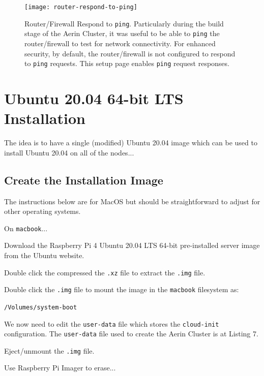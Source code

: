 \documentclass{report}
\begin{document}
\begin{figure}
	\centering	
	\texttt{[image: router-respond-to-ping]}
	\caption{Router/Firewall Respond to \texttt{ping}. Particularly during the build stage of the Aerin Cluster, it was useful to be able to \texttt{ping} the router/firewall to test for network connectivity. For enhanced security, by default, the router/firewall is not configured to respond to \texttt{ping} requests. This setup page enables \texttt{ping} request responses.}
\end{figure}


%
%
\clearpage\section{Ubuntu 20.04 64-bit LTS Installation}

The idea is to have a single (modified) Ubuntu 20.04 image which can be used to install Ubuntu 20.04 on all of the nodes...


%
%
\subsection{Create the Installation Image}

The instructions below are for MacOS but should be straightforward to adjust for other operating systems.

On \verb|macbook|...

Download the Raspberry Pi 4 Ubuntu 20.04 LTS 64-bit pre-installed server image from the Ubuntu website.

Double click the compressed the \verb|.xz| file to extract the \verb|.img| file. 

Double click the \verb|.img| file to mount the image in the \verb|macbook| filesystem as:

\verb|/Volumes/system-boot|

We now need to edit the \verb|user-data| file which stores the \verb|cloud-init| configuration. The \verb|user-data| file used to create the Aerin Cluster is at Listing 7.


\lstset{style=listing}



Eject/unmount the \verb|.img| file.

Use Raspberry Pi Imager to erase...
\end{document}

